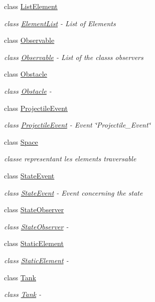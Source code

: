 \begin{DoxyCompactItemize}
class \hyperlink{classstate_1_1_list_element}{List\+Element}
\begin{DoxyCompactList}\small\item\em class \hyperlink{classstate_1_1_element_list}{Element\+List} -\/ List of Elements \end{DoxyCompactList}\item 
class \hyperlink{classstate_1_1_observable}{Observable}
\begin{DoxyCompactList}\small\item\em class \hyperlink{classstate_1_1_observable}{Observable} -\/ List of the class\textquotesingle{}s observers \end{DoxyCompactList}\item 
class \hyperlink{classstate_1_1_obstacle}{Obstacle}
\begin{DoxyCompactList}\small\item\em class \hyperlink{classstate_1_1_obstacle}{Obstacle} -\/ \end{DoxyCompactList}\item 
class \hyperlink{classstate_1_1_projectile_event}{Projectile\+Event}
\begin{DoxyCompactList}\small\item\em class \hyperlink{classstate_1_1_projectile_event}{Projectile\+Event} -\/ Event \char`\"{}\+Projectile\+\_\+\+Event\char`\"{} \end{DoxyCompactList}\item 
class \hyperlink{classstate_1_1_space}{Space}
\begin{DoxyCompactList}\small\item\em classe representant les elements traversable \end{DoxyCompactList}\item 
class \hyperlink{classstate_1_1_state_event}{State\+Event}
\begin{DoxyCompactList}\small\item\em class \hyperlink{classstate_1_1_state_event}{State\+Event} -\/ Event concerning the state \end{DoxyCompactList}\item 
class \hyperlink{classstate_1_1_state_observer}{State\+Observer}
\begin{DoxyCompactList}\small\item\em class \hyperlink{classstate_1_1_state_observer}{State\+Observer} -\/ \end{DoxyCompactList}\item 
class \hyperlink{classstate_1_1_static_element}{Static\+Element}
\begin{DoxyCompactList}\small\item\em class \hyperlink{classstate_1_1_static_element}{Static\+Element} -\/ \end{DoxyCompactList}\item 
class \hyperlink{classstate_1_1_tank}{Tank}
\begin{DoxyCompactList}\small\item\em class \hyperlink{classstate_1_1_tank}{Tank} -\/ \end{DoxyCompactList}\end{DoxyCompactItemize}
